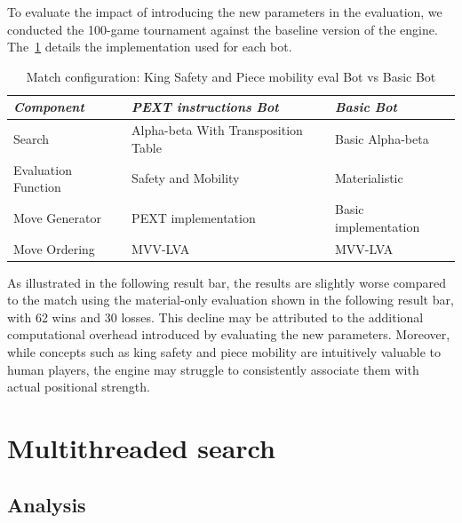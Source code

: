 To evaluate the impact of introducing the new parameters in the evaluation, we conducted the 100-game tournament against the baseline version of the engine. The~\cref{tab:safety_mobility_vs_basic} details the implementation used for each bot.

\vspace{1em}

\begin{table}
    \centering
    \begin{tabular}{|p{4cm}|p{4cm}|p{4cm}|}
    \hline
    \textit{Component}         & \textit{PEXT instructions Bot}  & \textit{Basic Bot}     \\ \hline
    Search                     & Alpha-beta With Transposition Table          & Basic Alpha-beta           \\ \hline
    Evaluation Function        & Safety and Mobility                      & Materialistic      \\ \hline
    Move Generator             & PEXT implementation              & Basic implementation   \\ \hline
    Move Ordering              & MVV-LVA                           & MVV-LVA                \\ \hline
    \end{tabular}
    \caption{Match configuration: King Safety and Piece mobility eval Bot vs Basic Bot}\label{tab:safety_mobility_vs_basic}
\end{table}

\noindent As illustrated in the following result bar, the results are slightly worse compared to the match using the material-only evaluation shown in the following result bar, with 62 wins and 30 losses. This decline may be attributed to the additional computational overhead introduced by evaluating the new parameters. Moreover, while concepts such as king safety and piece mobility are intuitively valuable to human players, the engine may struggle to consistently associate them with actual positional strength.

\begin{center}
\medskip
\end{center}

\section{Multithreaded search}

\subsection*{Analysis}

